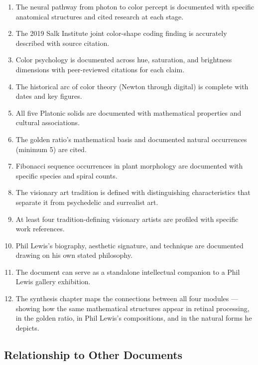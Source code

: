 \documentclass[11pt,letterpaper]{article}
\begin{document}
\begin{enumerate}
  \item The neural pathway from photon to color percept is documented with specific anatomical structures and cited research at each stage.
  \item The 2019 Salk Institute joint color-shape coding finding is accurately described with source citation.
  \item Color psychology is documented across hue, saturation, and brightness dimensions with peer-reviewed citations for each claim.
  \item The historical arc of color theory (Newton through digital) is complete with dates and key figures.
  \item All five Platonic solids are documented with mathematical properties and cultural associations.
  \item The golden ratio's mathematical basis and documented natural occurrences (minimum 5) are cited.
  \item Fibonacci sequence occurrences in plant morphology are documented with specific species and spiral counts.
  \item The visionary art tradition is defined with distinguishing characteristics that separate it from psychedelic and surrealist art.
  \item At least four tradition-defining visionary artists are profiled with specific work references.
  \item Phil Lewis's biography, aesthetic signature, and technique are documented drawing on his own stated philosophy.
  \item The document can serve as a standalone intellectual companion to a Phil Lewis gallery exhibition.
  \item The synthesis chapter maps the connections between all four modules --- showing how the same mathematical structures appear in retinal processing, in the golden ratio, in Phil Lewis's compositions, and in the natural forms he depicts.
\end{enumerate}

\subsection{Relationship to Other Documents}
\end{document}
